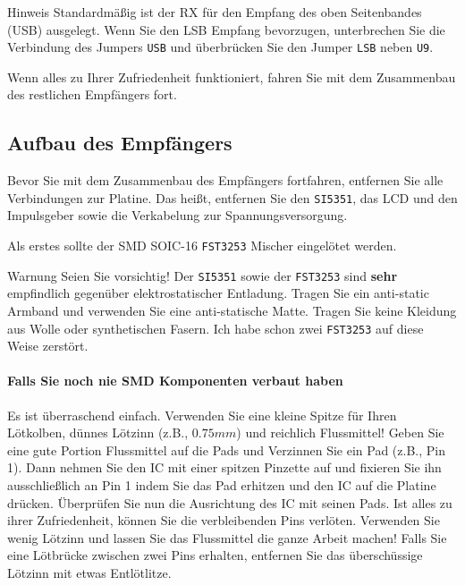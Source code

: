 \documentclass[10pt, a4paper,twoside]{scrartcl}
\newenvironment{remark}{\begin{bclogo}[couleur=blue!30,arrondi=.1,logo=\bcinfo,ombre=true]{Hinweis}}{\end{bclogo}}
\newenvironment{warning}{\begin{bclogo}[couleur=red!30,arrondi=.1,logo=\bcattention,ombre=true]{Warnung}}{\end{bclogo}}
\begin{document}
\begin{remark}
Standardmäßig ist der RX für den Empfang des oben Seitenbandes (USB) ausgelegt. Wenn Sie den LSB Empfang bevorzugen, unterbrechen Sie die Verbindung des Jumpers \texttt{USB} und überbrücken Sie den Jumper \texttt{LSB} neben \texttt{U9}.
\end{remark} 

Wenn alles zu Ihrer Zufriedenheit funktioniert, fahren Sie mit dem Zusammenbau des restlichen Empfängers fort.


\subsection{Aufbau des Empfängers}
Bevor Sie mit dem Zusammenbau des Empfängers fortfahren, entfernen Sie alle Verbindungen zur Platine. Das heißt, entfernen Sie den \texttt{SI5351}, das LCD und den Impulsgeber sowie die Verkabelung zur Spannungsversorgung.

Als erstes sollte der SMD SOIC-16 \texttt{FST3253} Mischer eingelötet werden. 

\begin{warning}
 Seien Sie vorsichtig! Der \texttt{SI5351} sowie der \texttt{FST3253} sind \textbf{sehr} empfindlich gegenüber elektrostatischer Entladung. Tragen Sie ein anti-static Armband und verwenden Sie eine anti-statische Matte. Tragen Sie keine Kleidung aus Wolle oder synthetischen Fasern. Ich habe schon zwei \texttt{FST3253} auf diese Weise zerstört. 
\end{warning}

\paragraph{Falls Sie noch nie SMD Komponenten verbaut haben}
 Es ist überraschend einfach. Verwenden Sie eine kleine Spitze für Ihren Lötkolben, dünnes Lötzinn (z.B., $0.75mm$) und reichlich Flussmittel! Geben Sie eine gute Portion Flussmittel auf die Pads und Verzinnen Sie ein Pad (z.B., Pin 1). Dann nehmen Sie den IC mit einer spitzen Pinzette auf und fixieren Sie ihn ausschließlich an Pin 1 indem Sie das Pad erhitzen und den IC auf die Platine drücken. Überprüfen Sie nun die Ausrichtung des IC mit seinen Pads. Ist alles zu ihrer Zufriedenheit, können Sie die verbleibenden Pins verlöten. Verwenden Sie wenig Lötzinn und lassen Sie das Flussmittel die ganze Arbeit machen! Falls Sie eine Lötbrücke zwischen zwei Pins erhalten, entfernen Sie das überschüssige Lötzinn mit etwas Entlötlitze.
\end{document}
